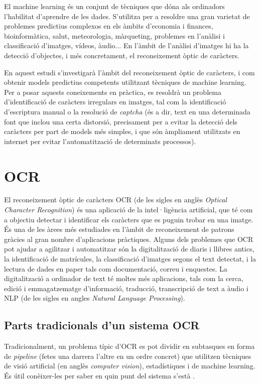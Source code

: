 \documentclass[12pt, spanish]{article}
\begin{document}
El machine learning és un conjunt de tècniques que dóna als ordinadors l'habilitat d'aprendre de les dades. S'utilitza per a resoldre una gran varietat de problemes predictius complexos en els àmbits d'economia i finances, bioinformàtica, salut, meteorologia, màrqueting, problemes en l'anàlisi i classificació d'imatges, vídeos, àudio... En l'àmbit de l'anàlisi d'imatges hi ha la detecció d'objectes, i més concretament, el reconeixement òptic de caràcters. 

En aquest estudi s'investigarà l'àmbit del reconeixement òptic de caràcters, i com obtenir models predictius competents utilitzant tècniques de machine learning. Per a posar aquests coneixements en pràctica, es resoldrà un problema d'identificació de caràcters irregulars en imatges, tal com la identificació d'escriptura manual o la resolució de \textit{captcha} (és a dir, text en una determinada font que inclou una certa distorsió, precisament per a evitar la detecció dels caràcters per part de models més simples, i que són àmpliament utilitzats en internet per evitar l'automatització de determinats processos).


\section{OCR}

El reconeixement òptic de caràcters OCR (de les sigles en anglès \textit{Optical Character Recognition}) és una aplicació de la intel·ligència artificial, que té com a objectiu detectar i identificar els caràcters que es puguin trobar en una imatge. És una de les àrees més estudiades en l'àmbit de reconeixement de patrons gràcies al gran nombre d'aplicacions pràctiques. Alguns dels problemes que OCR pot ajudar a agilitzar i automatitzar són la digitalització de diaris i llibres antics, la identificació de matrícules, la classificació d'imatges segons el text detectat, i la lectura de dades en paper tals com documentació, correu i enquestes. La digitalització a ordinador de text té moltes més aplicacions, tals com la cerca, edició i emmagatzematge d'informació, traducció, transcripció de text a àudio i NLP (de les sigles en angles \textit{Natural Language Processing}).


\subsection{Parts tradicionals d'un sistema OCR}

Tradicionalment, un problema típic d'OCR es pot dividir en subtasques en forma de \textit{pipeline} (fetes una darrera l'altre en un ordre concret) que utilitzen tècniques de visió artificial (en anglès \textit{computer vision}), estadístiques i de machine learning. És útil conèixer-les per saber en quin punt del sistema s'està \cite{chaudhuri2017optical}.
\end{document}
